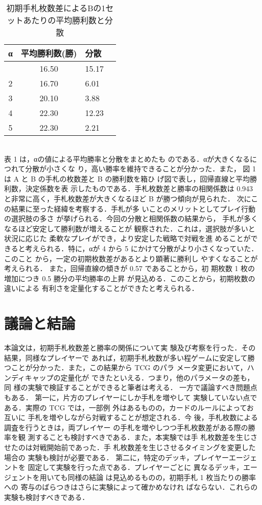 \documentclass[twocolumn]{ltjsarticle}
\begin{document}
\begin{table}[h]
  \centering
  \caption{初期手札枚数差によるBの1セットあたりの平均勝利数と分散}
  \hlines
  \begin{tabular}{clll}
    α &平均勝利数(勝)& 分散\\
    \hline \hline
    \centering
    1&\multicolumn{1}{c}{16.50}&\multicolumn{1}{l}{15.17}\\
    2&\multicolumn{1}{c}{16.70}&\multicolumn{1}{l}{6.01}\\
    3&\multicolumn{1}{c}{20.10}&\multicolumn{1}{l}{3.88}\\
    4&\multicolumn{1}{c}{22.30}&\multicolumn{1}{l}{12.23}\\
    5&\multicolumn{1}{c}{22.30}&\multicolumn{1}{l}{2.21}\\
    \hline%
  \end{tabular}
\end{table}
\\
\small{
  表 1 は，αの値による平均勝率と分散をまとめたも
のである．αが大きくなるにつれて分散が小さくな
り，高い勝率を維持できることが分かった．また，
図 1 は A と B の手札の枚数差と B の勝利数を箱ひ
げ図で表し，回帰直線と平均勝利数，決定係数を表
示したものである．手札枚数差と勝率の相関係数は
0.943 と非常に高く，手札枚数差が大きくなるほど B
が勝つ傾向が見られた．
次にこの結果に至った経緯を考察する．手札が多
いことのメリットとしてプレイ行動の選択肢の多さ
が挙げられる．今回の分散と相関係数の結果から，
手札が多くなるほど安定して勝利数が増えることが
観察された．これは，選択肢が多いと状況に応じた
柔軟なプレイができ，より安定した戦略で対戦を進
めることができると考えられる．特に，αが 4 から
5 にかけて分散がより小さくなっていた．このこと
から，一定の初期枚数差があるとより顕著に勝利し
やすくなることが考えられる．
また，回帰直線の傾きが 0.57 であることから，初
期枚数 1 枚の増加につき 0.5 勝分の平均勝率の上昇
が見込める．このことから，初期枚数の違いによる
有利さを定量化することができたと考えられる．
}

\section{議論と結論}
\small{
  本論文は，初期手札枚数差と勝率の関係について実
験及び考察を行った．その結果，同様なプレイヤーで
あれば，初期手札枚数が多い程ゲームに安定して勝
つことが分かった．また，この結果から TCG のパラ
メータ変更において，ハンディキャップの定量化が
できたといえる．つまり，他のパラメータの差も，同
様の実験で検証することができると筆者は考える．
一方で議論すべき問題点もある．
第一に，片方のプレイヤーにしか手札を増やして
実験していない点である．実際の TCG では，一部例
外はあるものの，カードのルールによってお互いに
手札を増やしながら対戦することが想定される．今
後，手札枚数による調査を行うときは，両プレイヤー
の手札を増やしつつ手札枚数差がある際の勝率を観
測することも検討すべきである．また，本実験では手
札枚数差を生じさせたのは対戦開始前であった．手
札枚数差を生じさせるタイミングを変更した場合の
実験も検討が必要である．
第二に，特定のデッキ，プレイヤーエージェントを
固定して実験を行った点である．プレイヤーごとに
異なるデッキ，エージェントを用いても同様の結論
は見込めるものの，初期手札 1 枚当たりの勝率への
寄与のばらつきはさらに実験によって確かめなけれ
ばならない．これらの実験も検討すべきである．
}
\end{document}
